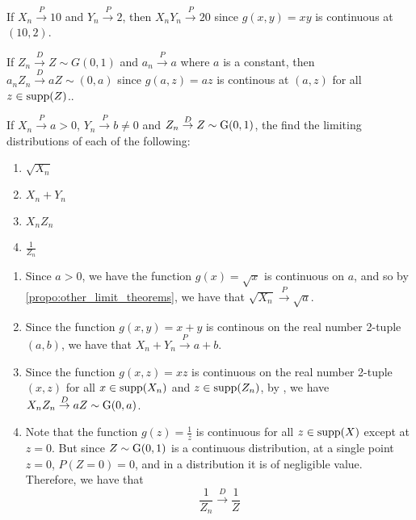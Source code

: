 \documentclass[notoc,notitlepage]{tufte-book}
\newcommand{\convd}{\overset{D}{\to}}
\newcommand{\convp}{\overset{P}{\to}}
\begin{document}
\begin{eg}
  If $X_n \convp 10$ and $Y_n \convp 2$, then $X_n Y_n \convp 20$ since $g(x, y) = xy$ is continuous at $(10, 2)$.

  \noindent If $Z_n \convd Z \sim G(0, 1)$ and $a_n \convp a$ where $a$ is a constant, then $a_n Z_n \convd aZ \sim (0, a)$ since $g(a, z) = az$ is continous at $(a, z)$ for all $z \in \operatorname{supp}(Z)$..
\end{eg}

\begin{eg}
  If $X_n \convp a > 0$, $Y_n \convp b \neq 0$ and $Z_n \convd Z \sim \Gau(0, 1)$, the find the limiting distributions of each of the following:
  \begin{enumerate}
    \item $\sqrt{X_n}$
    \item $X_n + Y_n$
    \item $X_n Z_n$
    \item $\frac{1}{Z_n}$
  \end{enumerate}
\end{eg}

\begin{solution}
  \begin{enumerate}
    \item Since $a > 0$, we have the function $g(x) = \sqrt{x}$ is continuous on $a$, and so by \cref{propo:other_limit_theorems}, we have that $\sqrt{X_n} \convp \sqrt{a}$.
    \item Since the function $g(x, y) = x + y$ is continous on the real number 2-tuple $(a, b)$, we have that $X_n + Y_n \convp a + b$.
    \item Since the function $g(x, z) = xz$ is continuous on the real number 2-tuple $(x, z)$ for all $x \in \operatorname{supp}(X_n)$ and $z \in \operatorname{supp}(Z_n)$, by , we have $X_n Z_n \convd a Z \sim \Gau(0, a)$.
    \item Note that the function $g(z) = \frac{1}{z}$ is continuous for all $z \in \operatorname{supp}(X)$ except at $z = 0$. But since $Z \sim \operatorname{G}(0, 1)$ is a continuous distribution, at a single point $z = 0$, $P(Z = 0) = 0$, and in a distribution it is of negligible value. Therefore, we have that
      \begin{equation*}
        \frac{1}{Z_n} \convd \frac{1}{Z}
      \end{equation*}
  \end{enumerate}
\end{solution}
\end{document}
